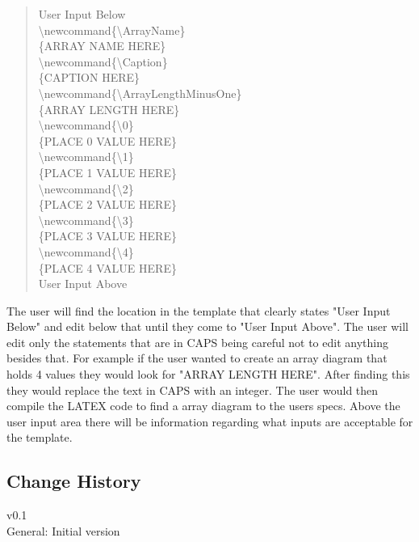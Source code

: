 \documentclass[10pt,a4paper,english]{article}
\begin{document}
\begin{quote}{\ttfamily \raggedright \noindent
User Input Below~\\
{\textbackslash}newcommand{\{}{\textbackslash}ArrayName{\}}~\\
{\{}ARRAY NAME HERE{\}}~\\
{\textbackslash}newcommand{\{}{\textbackslash}Caption{\}}~\\
{\{}CAPTION HERE{\}}~\\
{\textbackslash}newcommand{\{}{\textbackslash}ArrayLengthMinusOne{\}}~\\
{\{}ARRAY LENGTH HERE{\}}~\\
{\textbackslash}newcommand{\{}{\textbackslash}0{\}}~\\
{\{}PLACE 0 VALUE HERE{\}}~\\
{\textbackslash}newcommand{\{}{\textbackslash}1{\}}~\\
{\{}PLACE 1 VALUE HERE{\}}~\\
{\textbackslash}newcommand{\{}{\textbackslash}2{\}}~\\
{\{}PLACE 2 VALUE HERE{\}}~\\
{\textbackslash}newcommand{\{}{\textbackslash}3{\}}~\\
{\{}PLACE 3 VALUE HERE{\}}~\\
{\textbackslash}newcommand{\{}{\textbackslash}4{\}}~\\
{\{}PLACE 4 VALUE HERE{\}}~\\
User Input Above~\\
}\end{quote}

The user will find the location in the template that clearly states "User Input Below" and edit below that until they come to "User Input Above".  The user will edit only the statements that are in CAPS being careful not to edit anything besides that.  For example if the user wanted to create an array diagram that holds 4 values they would look for "ARRAY LENGTH HERE".  After finding this they would replace the text in CAPS with an integer.  The user would then compile the LATEX code to find a array diagram to the users specs.  Above the user input area there will be information regarding what inputs are acceptable for the template. 



\newpage
\begin{multicols}{2} %

\section*{Change History}
v0.1\\
\indent General: Initial version 
\end{multicols}
\end{document}
